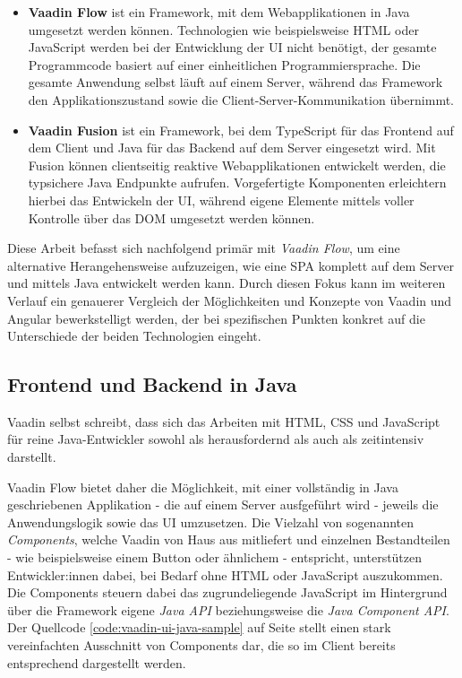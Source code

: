 \documentclass[a4paper,12pt,twoside]{scrreprt}
\begin{document}
\begin{itemize}
    \item \textbf{Vaadin Flow} ist ein Framework, mit dem Webapplikationen in Java umgesetzt werden können. Technologien wie beispielsweise HTML oder JavaScript werden bei der Entwicklung der \acs{UI} nicht benötigt, der gesamte Programmcode basiert auf einer einheitlichen Programmiersprache. Die gesamte Anwendung selbst läuft auf einem Server, während das Framework den Applikationszustand sowie die Client-Server-Kommunikation übernimmt. \parencite[][]{vaadin_ltd_vaadin_nodate}
    \item \textbf{Vaadin Fusion} ist ein Framework, bei dem TypeScript für das Frontend auf dem Client und Java für das Backend auf dem Server eingesetzt wird. Mit Fusion können clientseitig reaktive Webapplikationen entwickelt werden, die typsichere Java Endpunkte aufrufen. Vorgefertigte Komponenten erleichtern hierbei das Entwickeln der \acs{UI}, während eigene Elemente mittels voller Kontrolle über das \ac{DOM} umgesetzt werden können. \parencite[][]{vaadin_ltd_vaadin_nodate-1}
\end{itemize}

Diese Arbeit befasst sich nachfolgend primär mit \textit{Vaadin Flow}, um eine alternative Herangehensweise aufzuzeigen, wie eine \ac{SPA} komplett auf dem Server und mittels Java entwickelt werden kann. Durch diesen Fokus kann im weiteren Verlauf ein genauerer Vergleich der Möglichkeiten und Konzepte von Vaadin und Angular bewerkstelligt werden, der bei spezifischen Punkten konkret auf die Unterschiede der beiden Technologien eingeht.

\subsection{Frontend und Backend in Java}
\label{sub-sec:frontend-backend-java}
Vaadin selbst schreibt, dass sich das Arbeiten mit HTML, \ac{CSS} und JavaScript für reine Java-Entwickler sowohl als herausfordernd als auch als zeitintensiv darstellt. \parencite[][Framework - Introduction - Overview]{vaadin_ltd_documentation_nodate}

Vaadin Flow bietet daher die Möglichkeit, mit einer vollständig in Java geschriebenen Applikation - die auf einem Server ausfgeführt wird - jeweils die Anwendungslogik sowie das \acl{UI} umzusetzen. Die Vielzahl von sogenannten \textit{Components}, welche Vaadin von Haus aus mitliefert und einzelnen Bestandteilen - wie beispielsweise einem Button oder ähnlichem - entspricht, unterstützen Entwickler:innen dabei, bei Bedarf ohne HTML oder JavaScript auszukommen. Die Components steuern dabei das zugrundeliegende JavaScript im Hintergrund über die Framework eigene \textit{Java API} beziehungsweise die \textit{Java Component API}. Der Quellcode \ref{code:vaadin-ui-java-sample} auf Seite \pageref{code:vaadin-ui-java-sample} stellt einen stark vereinfachten Ausschnitt von Components dar, die so im Client bereits entsprechend dargestellt werden. \parencite[][Framework - Introduction - Overview]{vaadin_ltd_documentation_nodate}
\end{document}
